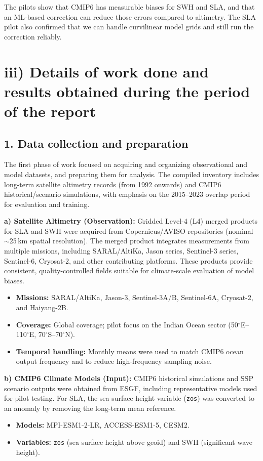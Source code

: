 \documentclass[11pt,a4paper]{article}
\begin{document}
The pilots show that CMIP6 has measurable biases for SWH and SLA, and that an ML-based correction can reduce those errors compared to altimetry. The SLA pilot also confirmed that we can handle curvilinear model grids and still run the correction reliably.

\section*{iii) Details of work done and results obtained during the period of the report}

\subsection*{1. Data collection and preparation}
The first phase of work focused on acquiring and organizing observational and model datasets, and preparing them for analysis. The compiled inventory includes long-term satellite altimetry records (from 1992 onwards) and CMIP6 historical/scenario simulations, with emphasis on the 2015--2023 overlap period for evaluation and training.

\textbf{a) Satellite Altimetry (Observation):}
Gridded Level-4 (L4) merged products for SLA and SWH were acquired from Copernicus/AVISO repositories (nominal $\sim$25\,km spatial resolution). The merged product integrates measurements from multiple missions, including SARAL/AltiKa, Jason series, Sentinel-3 series, Sentinel-6, Cryosat-2, and other contributing platforms. These products provide consistent, quality-controlled fields suitable for climate-scale evaluation of model biases.
\begin{itemize}
    \item \textbf{Missions:} SARAL/AltiKa, Jason-3, Sentinel-3A/B, Sentinel-6A, Cryosat-2, and Haiyang-2B.
    \item \textbf{Coverage:} Global coverage; pilot focus on the Indian Ocean sector (50$^\circ$E--110$^\circ$E, 70$^\circ$S--70$^\circ$N).
    \item \textbf{Temporal handling:} Monthly means were used to match CMIP6 ocean output frequency and to reduce high-frequency sampling noise.
\end{itemize}

\textbf{b) CMIP6 Climate Models (Input):}
CMIP6 historical simulations and SSP scenario outputs were obtained from ESGF, including representative models used for pilot testing. For SLA, the sea surface height variable (\texttt{zos}) was converted to an anomaly by removing the long-term mean reference.
\begin{itemize}
    \item \textbf{Models:} MPI-ESM1-2-LR, ACCESS-ESM1-5, CESM2.
    \item \textbf{Variables:} \texttt{zos} (sea surface height above geoid) and SWH (significant wave height).
\end{itemize}
\end{document}
